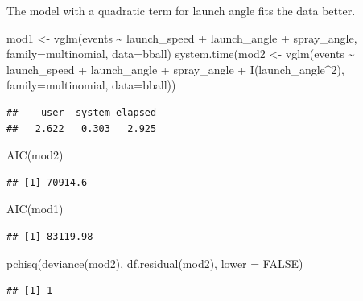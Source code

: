\documentclass[
  ignorenonframetext,
]{beamer}
\newenvironment{Shaded}{\begin{snugshade}}{\end{snugshade}}
\newcommand{\AttributeTok}[1]{\textcolor[rgb]{0.77,0.63,0.00}{#1}}
\newcommand{\ConstantTok}[1]{\textcolor[rgb]{0.00,0.00,0.00}{#1}}
\newcommand{\DecValTok}[1]{\textcolor[rgb]{0.00,0.00,0.81}{#1}}
\newcommand{\FunctionTok}[1]{\textcolor[rgb]{0.00,0.00,0.00}{#1}}
\newcommand{\NormalTok}[1]{#1}
\newcommand{\OtherTok}[1]{\textcolor[rgb]{0.56,0.35,0.01}{#1}}
\newcommand{\SpecialCharTok}[1]{\textcolor[rgb]{0.00,0.00,0.00}{#1}}
\begin{document}
\begin{frame}[fragile]{}
\protect\hypertarget{section-8}{}
The model with a quadratic term for launch angle fits the data better.

\vspace{12pt}
\tiny

\begin{Shaded}
\begin{Highlighting}[]
\NormalTok{mod1 }\OtherTok{\textless{}{-}} \FunctionTok{vglm}\NormalTok{(events }\SpecialCharTok{\textasciitilde{}}\NormalTok{ launch\_speed }\SpecialCharTok{+}\NormalTok{ launch\_angle }\SpecialCharTok{+}\NormalTok{ spray\_angle, }
             \AttributeTok{family=}\NormalTok{multinomial, }\AttributeTok{data=}\NormalTok{bball)}
\FunctionTok{system.time}\NormalTok{(mod2 }\OtherTok{\textless{}{-}} \FunctionTok{vglm}\NormalTok{(events }\SpecialCharTok{\textasciitilde{}}\NormalTok{ launch\_speed }\SpecialCharTok{+}\NormalTok{ launch\_angle }\SpecialCharTok{+}\NormalTok{ spray\_angle }\SpecialCharTok{+} 
               \FunctionTok{I}\NormalTok{(launch\_angle}\SpecialCharTok{\^{}}\DecValTok{2}\NormalTok{), }
             \AttributeTok{family=}\NormalTok{multinomial, }\AttributeTok{data=}\NormalTok{bball))}
\end{Highlighting}
\end{Shaded}

\begin{verbatim}
##    user  system elapsed 
##   2.622   0.303   2.925
\end{verbatim}

\begin{Shaded}
\begin{Highlighting}[]
\FunctionTok{AIC}\NormalTok{(mod2) }
\end{Highlighting}
\end{Shaded}

\begin{verbatim}
## [1] 70914.6
\end{verbatim}

\begin{Shaded}
\begin{Highlighting}[]
\FunctionTok{AIC}\NormalTok{(mod1)}
\end{Highlighting}
\end{Shaded}

\begin{verbatim}
## [1] 83119.98
\end{verbatim}

\begin{Shaded}
\begin{Highlighting}[]
\FunctionTok{pchisq}\NormalTok{(}\FunctionTok{deviance}\NormalTok{(mod2), }\FunctionTok{df.residual}\NormalTok{(mod2), }\AttributeTok{lower =} \ConstantTok{FALSE}\NormalTok{)}
\end{Highlighting}
\end{Shaded}

\begin{verbatim}
## [1] 1
\end{verbatim}
\end{frame}
\end{document}
